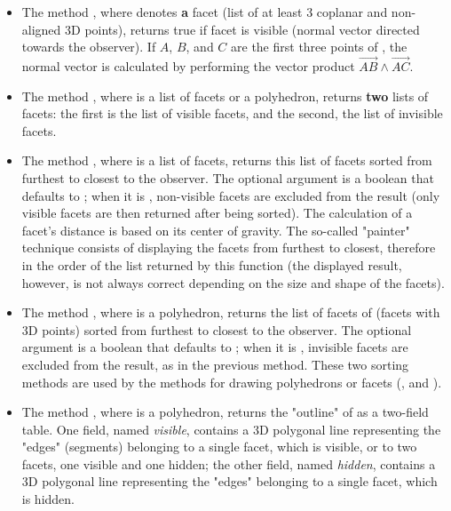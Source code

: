 \begin{itemize}
    \item The method , where  denotes \textbf{a} facet (list of at least 3 coplanar and non-aligned 3D points), returns true if facet  is visible (normal vector directed towards the observer). If $A$, $B$, and $C$ are the first three points of , the normal vector is calculated by performing the vector product $\vec{AB}\wedge\vec{AC}$.

    \item The method , where  is a list of facets or a polyhedron, returns \textbf{two} lists of facets: the first is the list of visible facets, and the second, the list of invisible facets.

    \item The method , where  is a list of facets, returns this list of facets sorted from furthest to closest to the observer. The optional argument  is a boolean that defaults to \false; when it is \true, non-visible facets are excluded from the result (only visible facets are then returned after being sorted). The calculation of a facet's distance is based on its center of gravity. The so-called "painter" technique consists of displaying the facets from furthest to closest, therefore in the order of the list returned by this function (the displayed result, however, is not always correct depending on the size and shape of the facets).

    \item The method , where  is a polyhedron, returns the list of facets of  (facets with 3D points) sorted from furthest to closest to the observer. The optional argument  is a boolean that defaults to \false; when it is \true, invisible facets are excluded from the result, as in the previous method. These two sorting methods are used by the methods for drawing polyhedrons or facets (,  and ).

    \item The method , where  is a polyhedron, returns the "outline" of  as a two-field table. One field, named \emph{visible}, contains a 3D polygonal line representing the "edges" (segments) belonging to a single facet, which is visible, or to two facets, one visible and one hidden; the other field, named \emph{hidden}, contains a 3D polygonal line representing the "edges" belonging to a single facet, which is hidden.


\end{itemize}

